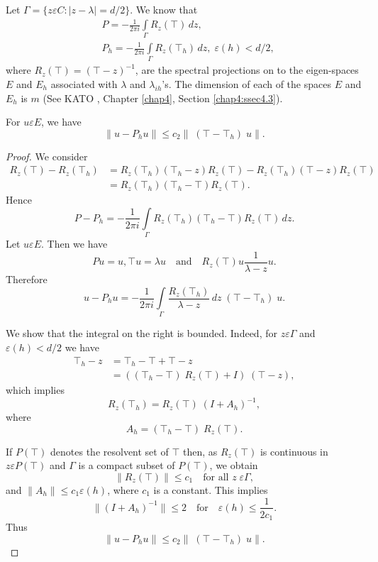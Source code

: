 Let $\Gamma=\{z\varepsilon C:|z-\lambda|=d/2\}$. We know that 
\begin{align}
&P=-\frac{1}{2\pi i}\int\limits_\Gamma
R_z(\top)\,dz,\label{chap8:eq8.12}\\
&P_h=-\frac{1}{2\pi i}\int\limits_\Gamma R_z(\top_h)\,dz,\;\varepsilon
(h)<d/2, \label{chap8:eq8.13}
\end{align}
where $R_z(\top)=(\top-z)^{-1}$, are the spectral projections on to
the eigen-spaces $E$ and $E_h$ associated with $\lambda$ and
$\lambda_{ih}$'s. The dimension of each of the spaces $E$ and $E_h$ is
$m$ (See KATO \cite{key26}, Chapter \ref{chap4}, Section
\ref{chap4:ssec4.3}). 
\setcounter{lem}{0}
\begin{lem}\label{chap8:lem1}
For $u\varepsilon E$, we have 
\begin{equation}\label{chap8:eq8.14}
\parallel u-P_hu\parallel \leq c_2\parallel
\;(\top-\top_h)\;u\parallel.
\end{equation}
\end{lem}

\begin{proof}
We consider 
\begin{align*}
R_z(\top)-R_z(\top_h) &= R_z(\top_h)(\top_h-z)R_z(\top)-R_z(\top_h)
(\top-z)R_z(\top)\\ 
&= R_z(\top_h)(\top_h-\top)R_z(\top).
\end{align*}
Hence
$$
P-P_h=-\frac{1}{2\pi i}\int\limits_\Gamma R_z(\top_h)(\top_h-\top)R_z
(\top)\,dz.
$$
Let $u\varepsilon E$. Then we have 
$$
Pu=u,\top u=\lambda u\quad\text{and}\quad
R_z(\top)u\frac{1}{\lambda-z}u. 
$$
Therefore\pageoriginale
$$
u-P_hu=-\frac{1}{2\pi i}\int\limits_\Gamma \frac{R_z(\top_h)}
{\lambda-z}\,dz\;(\top-\top_h)\;u.
$$

We show that the integral on the right is bounded. Indeed, for
$z\varepsilon\Gamma$ and $\varepsilon(h)<d/2$ we have 
\begin{align*}
\top_h-z &= \top_h-\top+\top-z\\
&= ((\top_h-\top)\;R_z(\top)+I)\;(\top-z),
\end{align*}
which implies
$$
R_z(\top_h)=R_z(\top)\;(I+A_h)^{-1},
$$
where 
$$
A_h=(\top_h-\top)\;R_z(\top).
$$

If $P(\top)$ denotes the resolvent set of $\top$ then, as $R_z(\top)$
is continuous in $z\varepsilon P(\top)$ and $\Gamma$ is a compact
subset of $P(\top)$, we obtain 
$$
\parallel R_z(\top)\parallel \leq c_1\quad\text{for all }
z\;\varepsilon \Gamma,
$$
and $\parallel A_h\parallel\leq c_1\varepsilon(h)$, where $c_1$ is a
constant. This implies
$$
\parallel(I+A_h)^{-1}\parallel\leq 2\quad\text{for}\quad\varepsilon(h)
\leq\frac{1}{2c_1}.
$$
Thus
$$
\parallel u-P_hu\parallel\leq c_2\parallel
\;(\top-\top_h)\;u\parallel.
$$
\end{proof}

